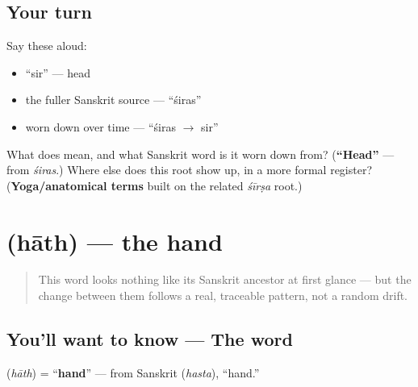 \subsection*{Your turn}
Say these aloud:

\begin{itemize}
\raggedright
  \item \textquotedblleft{}sir\textquotedblright{} — head
  \item the fuller Sanskrit source — \textquotedblleft{}śiras\textquotedblright{}
  \item worn down over time — \textquotedblleft{}śiras $\to$ sir\textquotedblright{}
\end{itemize}

\begin{tcolorbox}[breakable,colback=teal!4,colframe=teal!35!black,title={Before you move on}]
What does \textbf{} mean, and what Sanskrit word is it worn down from? (\textbf{\textquotedblleft{}Head\textquotedblright{}} — from \textbf{} \emph{śiras}.) Where else does this root show up, in a more formal register? (\textbf{Yoga/anatomical terms} built on the related \emph{śīrṣa} root.)
\end{tcolorbox}
\section[\texorpdfstring{\hi{हाथ} (hāth)}{हाथ (hāth)}]{ (hāth) — the hand}

\label{lesson:HI-C13-haath}



\begin{quote}
This word looks nothing like its Sanskrit ancestor at first glance — but the change between them follows a real, traceable pattern, not a random drift.
\end{quote}

\subsection*{You'll want to know — The word}
\textbf{} (\emph{hāth}) = \textquotedblleft{}\textbf{hand}\textquotedblright{} — from Sanskrit \textbf{} (\emph{hasta}), \textquotedblleft{}hand.\textquotedblright{}

